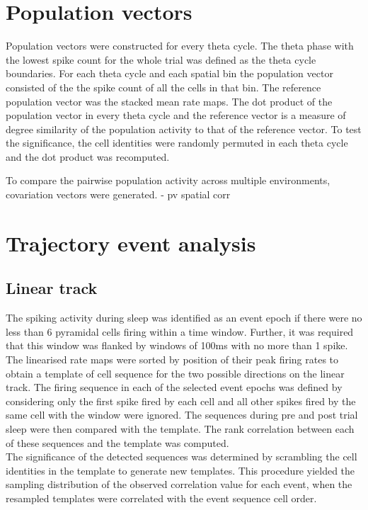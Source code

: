 \section{Population vectors}
Population vectors were constructed for every theta cycle. The theta phase with the lowest spike count for the whole trial was defined as the theta cycle boundaries. For each theta cycle and each spatial bin the population vector consisted of the the spike count of all the cells in that bin. The reference population vector was the stacked mean rate maps. The dot product of the population vector in every theta cycle and the reference vector is a measure of degree similarity of the population activity to that of the reference vector. To test the significance, the cell identities were randomly permuted in each theta cycle and the dot product was recomputed. 

To compare the pairwise population activity across multiple environments, covariation vectors were generated. 
\cite{Gothard1996} - pv spatial corr 

\section{Trajectory event analysis}
\subsection{Linear track}
The spiking activity during sleep was identified as an event epoch if there were no less than 6 pyramidal cells firing within a time window. Further, it was required that this window was flanked by windows of 100ms with no more than 1 spike. The linearised rate maps were sorted by position of their peak firing rates to obtain a template of cell sequence for the two possible directions on the linear track. The firing sequence in each of the selected event epochs was defined by considering only the first spike fired by each cell and all other spikes fired by the same cell with the window were ignored. The sequences during pre and post trial sleep were then compared with the template. The rank correlation between each of these sequences and the template was computed. \\ 
The significance of the detected sequences was determined by scrambling the cell identities in the template to generate new templates. This procedure yielded the sampling distribution of the observed correlation value for each event, when the resampled templates were correlated with the event sequence cell order.\\

